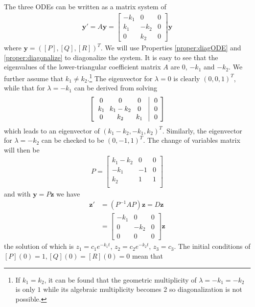 \begin{solution}
The three ODEs can be written as a matrix system of
\begin{align*}
\textbf{y}'
= A\textbf{y} =
\begin{bmatrix}
-k_1 & 0 & 0 \\
k_1 & -k_2 & 0 \\
0 & k_2 & 0 
\end{bmatrix}
\textbf{y}
\end{align*}
where $\textbf{y} = ([P], [Q], [R])^T$. We will use Properties \ref{proper:diagODE} and \ref{proper:diagonalize} to diagonalize the system. It is easy to see that the eigenvalues of the lower-triangular coefficient matrix $A$ are $0$, $-k_1$ and $-k_2$. We further assume that $k_1 \neq k_2$.\footnote{If $k_1 = k_2$, it can be found that the geometric multiplicity of $\lambda = -k_1 = -k_2$ is only $1$ while its algebraic multiplicity becomes $2$ so diagonalization is not possible.} The eigenvector for $\lambda = 0$ is clearly $(0,0,1)^T$, while that for $\lambda = -k_1$ can be derived from solving
\begin{align*}
\left[\begin{array}{@{\,}wc{18pt}wc{18pt}wc{18pt}|wc{10pt}@{\,}}
0 & 0 & 0 & 0 \\
k_1 & k_1-k_2 & 0 & 0 \\
0 & k_2 & k_1 & 0
\end{array}\right]    
\end{align*}
which leads to an eigenvector of $(k_1-k_2,-k_1,k_2)^T$. Similarly, the eigenvector for $\lambda = -k_2$ can be checked to be $(0,-1,1)^T$. The change of variables matrix will then be
\begin{align*}
P = 
\begin{bmatrix}
k_1-k_2 & 0 & 0\\
-k_1 & -1 & 0\\
k_2 & 1 & 1\\
\end{bmatrix}
\end{align*}
and with $\textbf{y} = P\textbf{z}$ we have
\begin{align*}
\textbf{z}' &= (P^{-1}AP)\textbf{z} = D\textbf{z}\\
&= 
\begin{bmatrix}
-k_1 & 0 & 0 \\
0 & -k_2 & 0 \\
0 & 0 & 0
\end{bmatrix}\textbf{z}
\end{align*}
the solution of which is $z_1 = c_1e^{-k_1t}$, $z_2 = c_2e^{-k_2t}$, $z_3 = c_3$. The initial conditions of $[P](0) = 1, [Q](0) = [R](0) = 0$ mean that

\end{solution}
